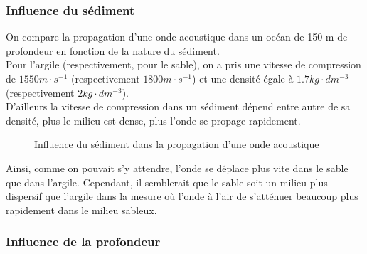 \documentclass{rapportECC}
\begin{document}
\subsubsection{Influence du sédiment}
On  compare la propagation d'une onde acoustique dans un océan de 150 m de profondeur en fonction de la nature du sédiment. \\
Pour l'argile (respectivement, pour le sable), on a pris une vitesse de compression de $1550 m \cdot s^{-1}$ (respectivement $1800 m \cdot s^{-1}$)  et une densité égale à $1.7 kg \cdot dm^{-3}$ (respectivement $2 kg \cdot dm^{-3}$).
\\
D'ailleurs la vitesse de compression dans un sédiment dépend entre autre de sa densité, plus le milieu est dense, plus l'onde se propage rapidement.
\begin{figure}[H]
    \centering
    \label{fig:image1}\hfill
    \caption{Influence du sédiment dans la propagation d'une onde acoustique}
    \label{fig:images_cote_a_cote}
\end{figure}
Ainsi, comme on pouvait s'y attendre, l'onde se déplace plus vite dans le sable que dans l'argile. Cependant, il semblerait que le sable soit un milieu plus dispersif que l'argile dans la mesure où l'onde à l'air de s'atténuer beaucoup plus rapidement dans le milieu sableux.

\subsubsection{Influence de la profondeur}
\end{document}
